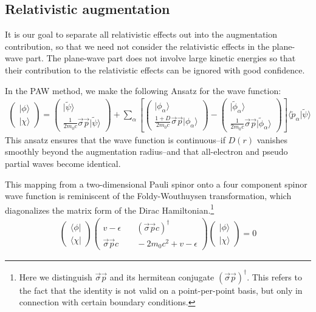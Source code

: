 \documentclass[11pt,a4paper]{report}
\begin{document}
\subsection{Relativistic augmentation}
It is our goal to separate all relativistic effects out into the
augmentation contribution, so that we need not consider the
relativistic effects in the plane-wave part. The plane-wave part does
not involve large kinetic energies so that their contribution to the
relativistic effects can be ignored with good confidence.

In the PAW method, we make the following Ansatz for the wave function:
\begin{eqnarray}
\left(\begin{array}{c}|\phi\rangle\\|\chi\rangle\end{array}\right)
=
\left(
\begin{array}{c}|\tilde{\psi}\rangle\\\frac{1}{2m_0c}\vec{\sigma}\vec{p}|\tilde\psi\rangle\end{array}\right)
+
\sum_\alpha
\left[
\left(
\begin{array}{c}|\phi_\alpha\rangle\\
\frac{1+D}{2m_0c}\vec{\sigma}\vec{p}|\phi_\alpha\rangle\end{array}\right)
-
\left(
\begin{array}{c}|\tilde{\phi}_\alpha\rangle\\
\frac{1}{2m_0c}\vec{\sigma}\vec{p}|\tilde{\phi}_\alpha\rangle\end{array}\right)
\right]
\langle\tilde{p}_\alpha|\tilde\psi\rangle
\end{eqnarray}
This ansatz ensures that the wave function is continuous--if $D(r)$
vanishes smoothly beyond the augmentation radius--and that all-electron and
pseudo partial waves become identical. 

This mapping from a two-dimensional Pauli spinor onto a four component
spinor wave function is reminiscent of the Foldy-Wouthuysen
transformation\cite{foldy50_pr78_29}, which diagonalizes the matrix
form of the Dirac Hamiltonian.\footnote{Here we distinguish
  $\vec{\sigma}\vec{p}$ and its hermitean conjugate
  $(\vec{\sigma}\vec{p})^\dagger$. This refers to the fact that the
  identity is not valid on a point-per-point basis, but only in
  connection with certain boundary conditions.}
\begin{eqnarray}
\left(\begin{array}{c}\langle\phi|\\
\langle\chi|\end{array}\right)
\left(\begin{array}{cc}
v-\epsilon &\quad (\vec{\sigma}\vec{p}c)^\dagger\\
\vec{\sigma}\vec{p}c &\quad -2m_0c^2+v-\epsilon\end{array}\right)
\left(\begin{array}{c}|\phi\rangle\\|\chi\rangle\end{array}\right)=0
\end{eqnarray}
\end{document}
